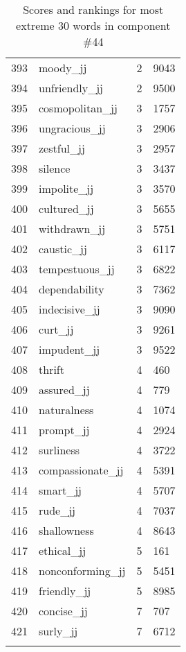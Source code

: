 \begin{longtable}[!htbp]{| rlr@{.}l |}
    393 & moody\_jj & 2 & 9043 \\
    394 & unfriendly\_jj & 2 & 9500 \\
    395 & cosmopolitan\_jj & 3 & 1757 \\
    396 & ungracious\_jj & 3 & 2906 \\
    397 & zestful\_jj & 3 & 2957 \\
    398 & silence & 3 & 3437 \\
    399 & impolite\_jj & 3 & 3570 \\
    400 & cultured\_jj & 3 & 5655 \\
    401 & withdrawn\_jj & 3 & 5751 \\
    402 & caustic\_jj & 3 & 6117 \\
    403 & tempestuous\_jj & 3 & 6822 \\
    404 & dependability & 3 & 7362 \\
    405 & indecisive\_jj & 3 & 9090 \\
    406 & curt\_jj & 3 & 9261 \\
    407 & impudent\_jj & 3 & 9522 \\
    408 & thrift & 4 & 460 \\
    409 & assured\_jj & 4 & 779 \\
    410 & naturalness & 4 & 1074 \\
    411 & prompt\_jj & 4 & 2924 \\
    412 & surliness & 4 & 3722 \\
    413 & compassionate\_jj & 4 & 5391 \\
    414 & smart\_jj & 4 & 5707 \\
    415 & rude\_jj & 4 & 7037 \\
    416 & shallowness & 4 & 8643 \\
    417 & ethical\_jj & 5 & 161 \\
    418 & nonconforming\_jj & 5 & 5451 \\
    419 & friendly\_jj & 5 & 8985 \\
    420 & concise\_jj & 7 & 707 \\
    421 & surly\_jj & 7 & 6712 \\
    \hline
    \caption{Scores and rankings for most extreme 30 words in component \#44} \\
\end{longtable}
